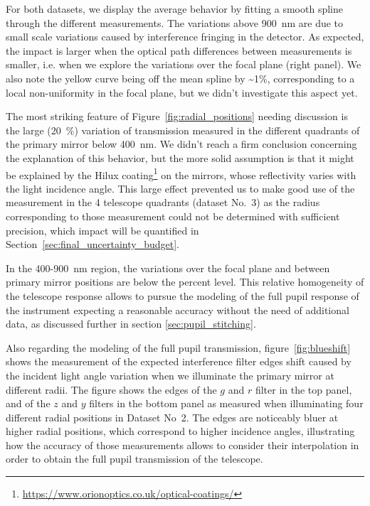 For both datasets, we display the average behavior by fitting a smooth spline through the different measurements. The variations above \SI{900}{\nano\meter} are due to small scale variations caused by interference fringing in the detector. As expected, the impact is larger when the optical path differences between measurements is smaller, i.e. when we explore the variations over the focal plane (right panel). We also note the yellow curve being off the mean spline by \textasciitilde 1\%, corresponding to a local non-uniformity in the focal plane, but we didn't investigate this aspect yet. 

The most striking feature of Figure~\ref{fig:radial_positions} needing discussion is the large (\SI{20}{\%}) variation of transmission measured in the different quadrants of the primary mirror below \SI{400}{\nano\meter}. We didn't reach a firm conclusion concerning the explanation of this behavior, but the more solid assumption is that it might be explained by the Hilux coating\footnote{\url{https://www.orionoptics.co.uk/optical-coatings/}} on the \SD mirrors, whose reflectivity varies with the light incidence angle. This large effect prevented us to make good use of the measurement in the 4 telescope quadrants (dataset No.~3) as the radius corresponding to those measurement could not be determined with sufficient precision, which impact will be quantified in Section~\ref{sec:final_uncertainty_budget}.

In the 400-\SI{900}{\nano\meter} region, the variations over the focal plane and
between primary mirror positions are below the percent level. This relative
homogeneity of the telescope response allows to pursue the modeling of the full
pupil response of the instrument expecting a reasonable accuracy without the
need of additional data, as discussed further in section \ref{sec:pupil_stitching}.

Also regarding the modeling of the full pupil transmission,
figure~\ref{fig:blueshift} shows the measurement of the expected interference
filter edges shift caused by the incident light angle variation when we
illuminate the primary mirror at different radii. The figure shows the edges of
the $g$ and $r$ filter in the top panel, and of the $z$ and $y$ filters in the
bottom panel as measured when illuminating four different radial positions in
Dataset No~2. The edges are noticeably bluer at higher radial positions, which
correspond to higher incidence angles, illustrating how the accuracy of those
measurements allows to consider their interpolation in order to obtain the full
pupil transmission of the telescope.

